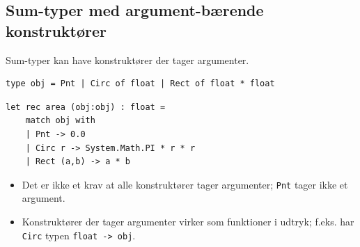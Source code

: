 \documentclass[rgb]{beamer}
\begin{document}
\subsection{Sum-typer med argument-bærende konstruktører}
\begin{frame}[fragile]
\begin{footnotesize}

  \vspace{1ex}

  Sum-typer kan have konstruktører der tager argumenter.

  \vspace{1ex}


\begin{lstlisting}[numbers=none,frame=none,mathescape]
  type obj = Pnt | Circ of float | Rect of float * float
\end{lstlisting}

  \vspace{1ex}
\begin{lstlisting}[numbers=none,frame=none,mathescape]
  let rec area (obj:obj) : float =
    match obj with
    | Pnt -> 0.0
    | Circ r -> System.Math.PI * r * r
    | Rect (a,b) -> a * b
\end{lstlisting}

  \vspace{1ex}

\begin{itemize}
\item Det er ikke et krav at alle konstruktører tager argumenter; \lstinline{Pnt} tager ikke et argument.
\item Konstruktører der tager argumenter virker som funktioner i udtryk; f.eks. har \lstinline{Circ} typen \lstinline{float -> obj}.
\end{itemize}

\end{footnotesize}
\end{frame}
\end{document}
